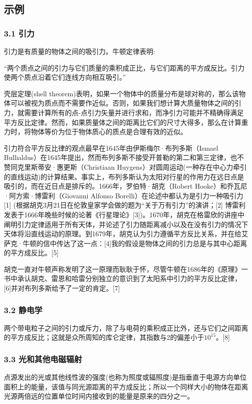 \subsection{示例}
\subsubsection{3.1 引力}
引力是有质量的物体之间的吸引力。牛顿定律表明:

“两个质点之间的引力与它们质量的乘积成正比，与它们距离的平方成反比。引力使两个质点沿着它们连线方向相互吸引。”

壳层定理(shell theorem)表明，如果一个物体中的质量分布是球对称的，那么该物体可以被视为质点而不需要作近似。否则，如果我们想计算大质量物体之间的引力，就需要计算所有的点-点引力矢量并进行求和，而净引力可能并不精确得满足平方反比定律。然而，如果质量体之间的距离比它们的尺寸大得多，那么在计算重力时，将物体等价为位于物体质心的质点是合理有效的近似。

引力符合平方反比律的观点最早在1645年由伊斯梅尔·布列多斯（Ismael Bullialdus）在1645年提出，然而布列多斯不接受开普勒的第二和第三定律，也不赞同克里斯蒂安·惠更斯（Christiaan Huygens）对圆周运动(一种存在中心力牵引的直线运动)的计算结果。事实上，布列多斯认为太阳对行星的作用力在远日点是吸引的，而在近日点是排斥的。1666年，罗伯特·胡克（Robert Hooke）和乔瓦尼·阿方索·博雷利（Giovanni Alfonso Borelli）在论述中都认为是引力一种吸引力[1] (根据胡克3月21日在伦敦皇家学会做的题为“关于万有引力”的演讲；[2] 博雷利发表于1666年晚些时候的论著《行星理论》[3])。1670年，胡克在格雷欣的讲座中阐明引力定律适用于所有天体，并论述了引力随距离减小以及在没有引力的情况下天体将沿直线运动的原理。到1679年，胡克认为引力遵循平方反比关系，并在给艾萨克·牛顿的信中传达了这一点：[4]我的假设是物体之间的引力总是与其中心距离的平方成反比。[5]

胡克一直对牛顿声称发明了这一原理而耿耿于怀，尽管牛顿在1686年的《原理》一书中承认胡克、雷恩和哈雷分别独立的意识到了太阳系中引力的平方反比定律，[6]并对布列多斯给予了一定的肯定。[7]
\subsubsection{3.2 静电学}
两个带电粒子之间的引力或斥力，除了与电荷的乘积成正比外，还与它们之间距离的平方成反比；这就是众所周知的库仑定律，其指数与2的偏差小于$10^{15}$。[8]
\subsubsection{3.3 光和其他电磁辐射}
点源发出的光或其他线性波的强度(也称为照度或辐照度)是指垂直于电源方向单位面积上的能量，该值与同光源距离的平方成反比；所以一个同样大小的物体在距离光源两倍远的位置单位时间内接收到的能量是原来的四分之一。

